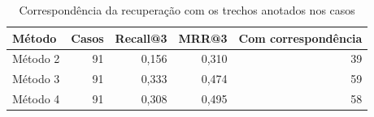 \begin{table}[htbp]
\centering
\small
\caption{Correspondência da recuperação com os trechos anotados nos casos}
\label{tab:recuperacao}
\begin{tabular}{lrrrr}
\hline
Método & Casos & Recall@3 & MRR@3 & Com correspondência \\
\hline
Método 2 & 91 & 0,156 & 0,310 & 39 \\
Método 3 & 91 & 0,333 & 0,474 & 59 \\
Método 4 & 91 & 0,308 & 0,495 & 58 \\
\hline
\end{tabular}
\end{table}
